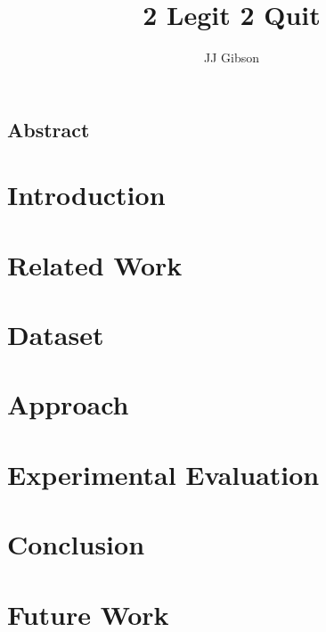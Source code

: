 \documentclass[twoside,10pt]{report}
\newcommand{\clearemptydoublepage}{\newpage{\pagestyle{empty}\cleardoublepage}}
\begin{document}
\title{2 Legit 2 Quit}
\author{JJ Gibson}



\clearpage


\clearemptydoublepage
\setcounter{page}{1}

\begin{centering} \section*{Abstract} \end{centering}


\tableofcontents
\clearpage


\setcounter{page}{1}


\chapter{Introduction}
\label{chap:introduction}


\clearpage

\chapter{Related Work}
\label{chap:related_work}


\clearpage

\chapter{Dataset}
\label{chap:dataset}


\clearpage

\chapter{Approach}
\label{chape:approach}


\clearpage

\chapter{Experimental Evaluation}
\label{chap:experimental_evaluation}


\clearpage

\chapter{Conclusion}
\label{chap:discussion}


\clearpage

\chapter{Future Work}
\label{chap:future_work}


\clearpage 

 
{\small }
\end{document}
